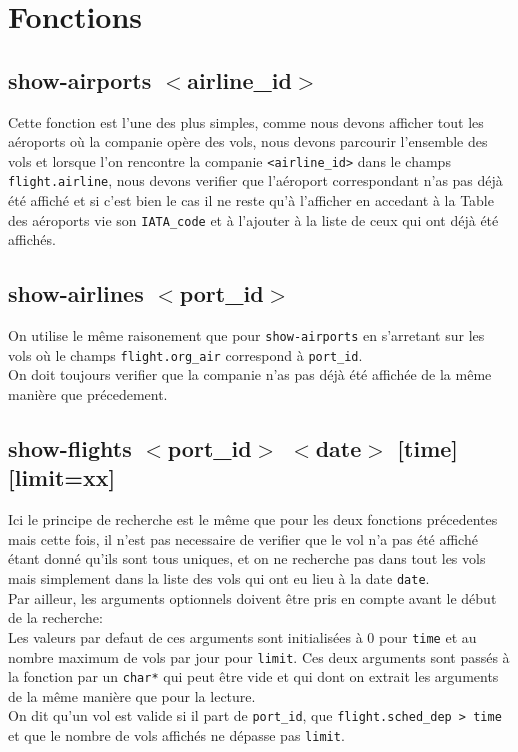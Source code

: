 \documentclass[a4paper, 12pt]{article}
\begin{document}
	\section{Fonctions}
	\subsection{\texorpdfstring{show-airports $<$airline\_id$>$}{show-airports <airline\_id>}}
	Cette fonction est l'une des plus simples, comme nous devons afficher tout les aéroports où la companie opère des vols, nous devons parcourir l'ensemble des vols et lorsque l'on rencontre la companie \lstinline|<airline_id>| dans le champs \lstinline|flight.airline|, nous devons verifier que l'aéroport correspondant n'as pas déjà été affiché et si c'est bien le cas il ne reste qu'à l'afficher en accedant à la Table des aéroports vie son \lstinline|IATA_code| et à l'ajouter à la liste de ceux qui ont déjà été affichés.
	
	\subsection{\texorpdfstring{show-airlines $<$port\_id$>$}{show-airlines <port\_id>}}
	On utilise le même raisonement que pour \lstinline|show-airports| en s'arretant sur les vols où le champs \lstinline|flight.org_air| correspond à \lstinline|port_id|.\\
	On doit toujours verifier que la companie n'as pas déjà été affichée de la même manière que précedement.\\
	
	\subsection{\texorpdfstring{show-flights $<$port\_id$>$ $<$date$>$ [time] [limit=xx]}{}}
	Ici le principe de recherche est le même que pour les deux fonctions précedentes mais cette fois, il n'est pas necessaire de verifier que le vol n'a pas été affiché étant donné qu'ils sont tous uniques, et on ne recherche pas dans tout les vols mais simplement dans la liste des vols qui ont eu lieu à la date \lstinline|date|.\\
	Par ailleur, les arguments optionnels doivent être pris en compte avant le début de la recherche:\\
	Les valeurs par defaut de ces arguments sont initialisées à 0 pour \lstinline|time| et au nombre maximum de vols par jour pour \lstinline|limit|. Ces deux arguments sont passés à la fonction par un \lstinline|char*| qui peut être vide et qui dont on extrait les arguments de la même manière que pour la lecture.\\
	On dit qu'un vol est valide si il part de \lstinline|port_id|, que \lstinline|flight.sched_dep > time| et que le nombre de vols affichés ne dépasse pas \lstinline|limit|.\\ 
	
\end{document}
